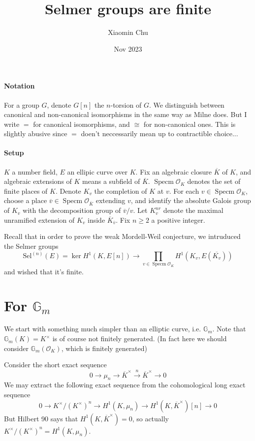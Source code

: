 \documentclass{article}
\title{Selmer groups are finite}
\author{Xiaomin Chu}
\date{Nov 2023}
\newcommand{\ord}{\mathcal{O}}
\newcommand{\mn}{\mu_{n}}
\newcommand{\kmkn}{K ^{\times} / (K ^{\times})^{n}}
\DeclareMathOperator{\spec}{Specm}
\begin{document}
\maketitle

\paragraph{Notation}
For a group $ G $, denote $ G [n] $ the $ n $-torsion of $ G $.
We distinguish between canonical and non-canonical isomorphisms in the same way as Milne does.
But I write $ = $ for canonical isomorphisms, and $ \cong $ for non-canonical ones.
This is slightly abusive since $ = $ doen't neccessarily mean up to contractible choice...

\paragraph{Setup}
$ K $ a number field, $ E $ an ellipic curve over $ K $.
Fix an algebraic closure $ \overline{K} $ of $ K $,
and algebraic extensions of $ K $ means a subfield of $ \overline{K} $.
$ \spec \ord _{K} $ denotes the set of finite places of $ K $.
Denote $ K _{v} $ the completion of $ K $ at $ v $.
For each $ v\in \spec \ord _{K} $, choose a place
$ \overline{v}\in \spec \ord _{\overline{K}} $ extending $ v $,
and identify the absolute Galois group of $ K _{v} $ with
the decomposition group of $ \overline{v}/v $.
Let $ K _{v}^{nr} $ denote the maximal unramified extension of $ K _{v} $
inside $ \overline{K}_{\overline{v}} $.
Fix $ n \geq 2 $ a positive integer.

Recall that in order to prove the weak Mordell-Weil conjecture,
we intruduced the Selmer groups
$$ \mathrm{Sel}^{(n)}(E) = \ker H ^{1}(K, E [n])\to
\prod _{v\in \spec \ord _{K}} H ^{1}(K _{v}, E (\overline{K _{v}})) $$
and wished that it's finite.

\section{For $ \mathbb{G}_{m} $}

We start with something much simpler than an elliptic curve, i.e. $ \mathbb{G}_{m} $.
Note that $ \mathbb{G}_{m}(K) = K ^{\times} $ is of course not finitely generated.
(In fact here we should consider $ \mathbb{G}_{m}(\ord _{K}) $, which is finitely generated)

Consider the short exact sequence
$$ 0 \to \mn \to \overline{K}^{\times} \xrightarrow{n} \overline{K}^{\times}\to 0 $$
We may extract the following exact sequence from the cohomological long exact sequence
$$ 0\to \kmkn \to H ^{1}(K, \mn)\to H ^{1}(K, \overline{K}^{\times})[n]\to 0  $$
But Hilbert 90 says that $ H ^{1}(K, \overline{K}^{\times}) = 0 $,
so actually $ \kmkn = H ^{1}(K, \mn) $.
\end{document}
